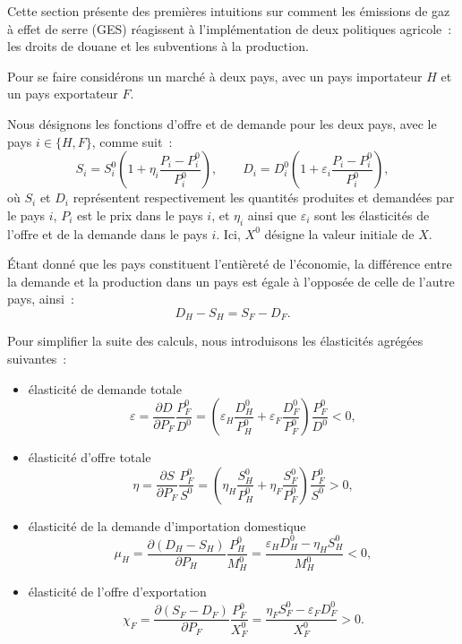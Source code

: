 Cette section présente des premières intuitions sur comment les émissions de gaz à effet de serre (GES) réagissent à l'implémentation de deux politiques agricole~: les droits de douane et les subventions à la production.

Pour se faire considérons un marché à deux pays, avec un pays importateur $H$ et un pays exportateur $F$.

Nous désignons les fonctions d'offre et de demande pour les deux pays, avec le pays $i \in \{H, F\}$, comme suit~:
\begin{equation}
    S_i = S_i^0\left(1 + \eta_i\frac{P_i - P_i^0}{P_i^0}\right), \qquad
    D_i = D_i^0\left(1 + \varepsilon_i\frac{P_i - P_i^0}{P_i^0}\right),
\end{equation}
où $S_i$ et $D_i$ représentent respectivement les quantités produites et demandées par le pays $i$, $P_i$ est le prix dans le pays $i$, et $\eta_i$ ainsi que $\varepsilon_i$ sont les élasticités de l'offre et de la demande dans le pays $i$. Ici, $X^0$ désigne la valeur initiale de $X$.

Étant donné que les pays constituent l'entièreté de l'économie, la différence entre la demande et la production dans un pays est égale à l'opposée de celle de l'autre pays, ainsi~:
\begin{equation}
    D_H - S_H = S_F - D_F.
\end{equation}

Pour simplifier la suite des calculs, nous introduisons les élasticités agrégées suivantes~:
\begin{itemize}
    \item élasticité de demande totale
          \begin{equation}
              \varepsilon = \frac{\partial D}{\partial P_F} \frac{P_F^0}{D^0} = \left( \varepsilon_H \frac{D_H^0}{P_H^0} + \varepsilon_F \frac{D_F^0}{P_F^0} \right)\frac{P_F^0}{D^0} < 0,
          \end{equation}
    \item élasticité d'offre totale
          \begin{equation}
              \eta = \frac{\partial S}{\partial P_F} \frac{P_F^0}{S^0} = \left( \eta_H \frac{S_H^0}{P_H^0} + \eta_F \frac{S_F^0}{P_F^0} \right)\frac{P_F^0}{S^0} > 0,
          \end{equation}
    \item élasticité de la demande d'importation domestique
          \begin{equation}
              \mu_H = \frac{\partial (D_H - S_H)}{\partial P_H} \frac{P_H^0}{M_H^0} = \frac{\varepsilon_H D_H^0 - \eta_H S_H^0}{M_H^0} < 0,
          \end{equation}
    \item élasticité de l'offre d'exportation
          \begin{equation}
              \chi_F = \frac{\partial (S_F - D_F)}{\partial P_F} \frac{P_F^0}{X_F^0} = \frac{\eta_F S_F^0 - \varepsilon_F D_F^0}{X_F^0} > 0.
          \end{equation}
\end{itemize}

